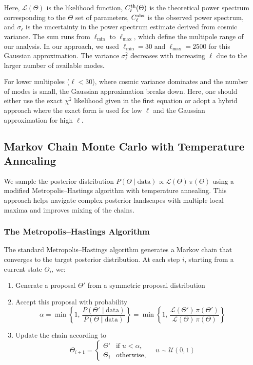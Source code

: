 \documentclass[11pt]{article}
\theoremstyle{definition}
\begin{document}
Here, $\mathcal{L}(\Theta)$ is the likelihood function, $C_\ell^{\rm th}(\Theta)$ is the theoretical power spectrum corresponding to the $\Theta$ set of parameters, $C_\ell^{\rm obs}$ is the observed power spectrum, and $\sigma_\ell$ is the uncertainty in the power spectrum estimate derived from cosmic variance. The sum runs from $\ell_{\min}$ to $\ell_{\max}$, which define the multipole range of our analysis. In our approach, we used $\ell_{\min}=30$ and $\ell_{\max}=2500$ for this Gaussian approximation. The variance $\sigma_\ell^2$ decreases with increasing $\ell$ due to the larger number of available modes.

For lower multipoles ($\ell<30$), where cosmic variance dominates and the number of modes is small, the Gaussian approximation breaks down. Here, one should either use the exact $\chi^2$ likelihood given in the first equation or adopt a hybrid approach where the exact form is used for low $\ell$ and the Gaussian approximation for high $\ell$.

\subsection{Markov Chain Monte Carlo with Temperature Annealing}

We sample the posterior distribution $P(\Theta\mid\mathrm{data})\propto \mathcal{L}(\Theta)\,\pi(\Theta)$ using a modified Metropolis--Hastings algorithm with temperature annealing. This approach helps navigate complex posterior landscapes with multiple local maxima and improves mixing of the chains.

\subsubsection{The Metropolis--Hastings Algorithm}

The standard Metropolis--Hastings algorithm generates a Markov chain that converges to the target posterior distribution. At each step $i$, starting from a current state $\Theta_i$, we:

\begin{enumerate}
\item Generate a proposal $\Theta'$ from a symmetric proposal distribution
\item Accept this proposal with probability
\begin{equation}
  \alpha = \min \left\{1,\,
    \frac{P(\Theta'\mid\mathrm{data})}{P(\Theta\mid\mathrm{data})}
  \right\} = \min \left\{1,\,
    \frac{\mathcal{L}(\Theta')\,\pi(\Theta')}
         {\mathcal{L}(\Theta)\,\pi(\Theta)}
  \right\}
\end{equation}
\item Update the chain according to
\begin{equation}
  \Theta_{i+1} =
  \begin{cases}
    \Theta' & \text{if }u<\alpha,\\
    \Theta_i & \text{otherwise},
  \end{cases}
  \quad u\sim\mathcal{U}(0,1)
\end{equation}
\end{enumerate}
\end{document}
